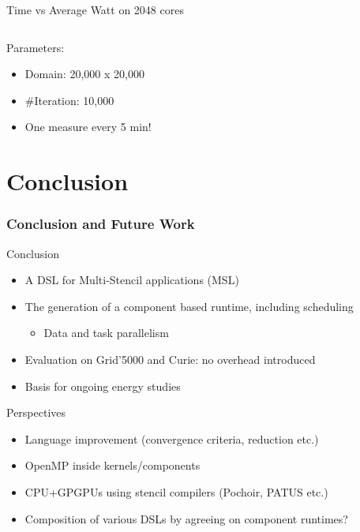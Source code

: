 \documentclass{beamer}
\begin{document}
\begin{frame}
\begin{columns}
\begin{column}{6cm}
\begin{center}
{\vspace{-1em}\small Time vs Average Watt on 2048 cores}
\end{center}
\end{column}
\end{columns}
\bigskip
{\small
\begin{block}{Parameters:}
\begin{itemize}
\vspace{-0.7em}\item Domain: 20,000 x 20,000
\item \#Iteration: 10,000
\item One measure every 5 min!
\end{itemize}
\end{block}
}
  
\end{frame}


\section{Conclusion}
\begin{frame}
\frametitle{Conclusion and Future Work}
\begin{block}{Conclusion}
\begin{itemize}
\vspace{-0.4em}\item A DSL for Multi-Stencil applications (MSL)
\item The generation of a component based runtime, including scheduling
\begin{itemize}
\item Data and task parallelism
\end{itemize}
\item Evaluation on Grid'5000 and Curie: no overhead introduced
\item Basis for ongoing energy studies
\end{itemize}
\end{block}

\begin{block}{Perspectives}
  \begin{itemize}
\vspace{-0.4em}  \item Language improvement (convergence criteria, reduction etc.)
  \item OpenMP inside kernels/components
  \item CPU+GPGPUs using stencil compilers (Pochoir, PATUS etc.)
  \item Composition of various DSLs by agreeing on component runtimes?
  \end{itemize}
\end{block}
\end{frame}
\end{document}
